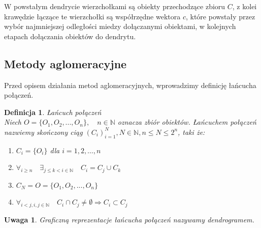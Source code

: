 \documentclass[12pt,a4paper]{report}
\newtheorem{definition}[theorem]{Definicja}
\newtheorem{uwaga}{Uwaga}
\begin{document}
W powstałym dendrycie wierzchołkami są obiekty przechodzące zbioru $C$, z kolei krawędzie łączące te wierzchołki są współrzędne wektora $c$, które powstały przez wybór najmniejszej odległości miedzy dołączanymi obiektami, w kolejnych etapach dołączania obiektów do dendrytu. 

\subsection{Metody aglomeracyjne}

Przed opisem działania metod aglomeracyjnych, wprowadzimy definicję łańcucha połączeń.

\begin{definition}{Łańcuch połączeń}\\
Niech $O=\{O_{1},O_{2},..., O_{n}\}, \quad n\in \mathbb{N}$ oznacza zbiór obiektów. Łańcuchem połączeń nazwiemy skończony ciąg $(C_{i})_{i=1}^{N},  N \in \mathbb{N}, n\leq N \leq 2^n$, taki że:
\begin{enumerate}
\item $C_{i}=\{O_{i}\}$ dla $i=1, 2, \ldots, n$
\item $\forall_{i\geq n} \quad \exists_{j\leq k < i \in \mathbb{N}} \quad C_{i}=C_{j} \cup C_{k}$
\item $C_{N}=O=\{O_{1},O_{2},..., O_{n}\}$
\item $\forall_{i<j,  {i,j \in \mathbb{N}}} \quad C_{i} \cap C_{j} \neq \emptyset \Rightarrow  C_{i} \subset C_{j}$ 
\end{enumerate}
\end{definition}

\begin{uwaga}
Graficzną reprezentacje łańcucha połączeń nazywamy dendrogramem. 
\end{uwaga}
\end{document}
